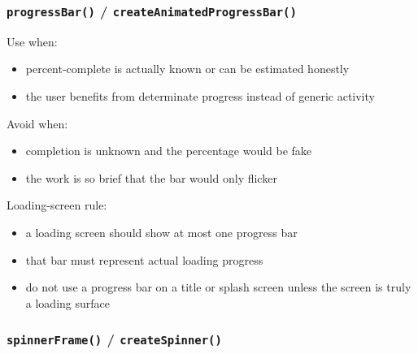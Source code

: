 \subsubsection{\texorpdfstring{\texttt{p\allowbreak{}r\allowbreak{}o\allowbreak{}g\allowbreak{}r\allowbreak{}e\allowbreak{}s\allowbreak{}s\allowbreak{}B\allowbreak{}a\allowbreak{}r\allowbreak{}(\allowbreak{})} / \texttt{c\allowbreak{}r\allowbreak{}e\allowbreak{}a\allowbreak{}t\allowbreak{}e\allowbreak{}A\allowbreak{}n\allowbreak{}i\allowbreak{}m\allowbreak{}a\allowbreak{}t\allowbreak{}e\allowbreak{}d\allowbreak{}P\allowbreak{}r\allowbreak{}o\allowbreak{}g\allowbreak{}r\allowbreak{}e\allowbreak{}s\allowbreak{}s\allowbreak{}B\allowbreak{}a\allowbreak{}r\allowbreak{}(\allowbreak{})}}{ / }}\label{record-023-progressbar-createanimatedprogressbar}

Use when:

\begin{itemize}
\tightlist
\item
  percent-complete is actually known or can be estimated honestly
\item
  the user benefits from determinate progress instead of generic activity
\end{itemize}

Avoid when:

\begin{itemize}
\tightlist
\item
  completion is unknown and the percentage would be fake
\item
  the work is so brief that the bar would only flicker
\end{itemize}

Loading-screen rule:

\begin{itemize}
\tightlist
\item
  a loading screen should show at most one progress bar
\item
  that bar must represent actual loading progress
\item
  do not use a progress bar on a title or splash screen unless the screen is truly a loading surface
\end{itemize}

\subsubsection{\texorpdfstring{\texttt{s\allowbreak{}p\allowbreak{}i\allowbreak{}n\allowbreak{}n\allowbreak{}e\allowbreak{}r\allowbreak{}F\allowbreak{}r\allowbreak{}a\allowbreak{}m\allowbreak{}e\allowbreak{}(\allowbreak{})} / \texttt{c\allowbreak{}r\allowbreak{}e\allowbreak{}a\allowbreak{}t\allowbreak{}e\allowbreak{}S\allowbreak{}p\allowbreak{}i\allowbreak{}n\allowbreak{}n\allowbreak{}e\allowbreak{}r\allowbreak{}(\allowbreak{})}}{ / }}\label{record-023-spinnerframe-createspinner}

